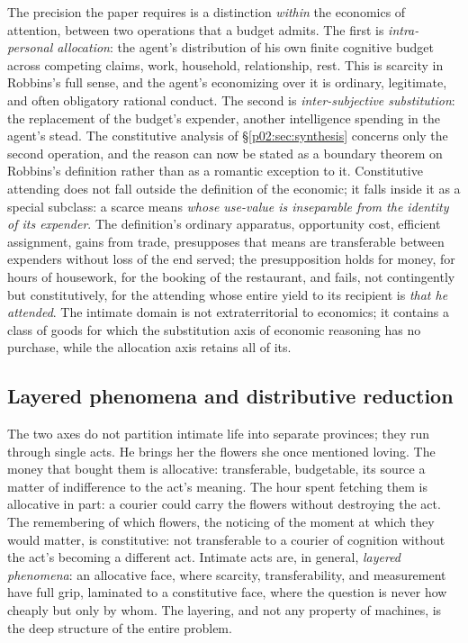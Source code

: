 \documentclass[11pt,a4paper]{article}
\newcommand{\term}[1]{\textit{\textcolor{pinkitalic}{#1}}}
\begin{document}
The precision the paper requires is a distinction \emph{within} the economics of attention, between two operations that a budget admits. The first is \term{intra-personal allocation}: the agent's distribution of his own finite cognitive budget across competing claims, work, household, relationship, rest. This is scarcity in Robbins's full sense, and the agent's economizing over it is ordinary, legitimate, and often obligatory rational conduct. The second is \term{inter-subjective substitution}: the replacement of the budget's expender, another intelligence spending in the agent's stead. The constitutive analysis of \S\ref{p02:sec:synthesis} concerns only the second operation, and the reason can now be stated as a boundary theorem on Robbins's definition rather than as a romantic exception to it. Constitutive attending does not fall outside the definition of the economic; it falls inside it as a special subclass: a scarce means \emph{whose use-value is inseparable from the identity of its expender}. The definition's ordinary apparatus, opportunity cost, efficient assignment, gains from trade, presupposes that means are transferable between expenders without loss of the end served; the presupposition holds for money, for hours of housework, for the booking of the restaurant, and fails, not contingently but constitutively, for the attending whose entire yield to its recipient is \emph{that he attended}. The intimate domain is not extraterritorial to economics; it contains a class of goods for which the substitution axis of economic reasoning has no purchase, while the allocation axis retains all of its.

\subsection{Layered phenomena and distributive reduction}
\label{p02:sec:pe-layered}

The two axes do not partition intimate life into separate provinces; they run through single acts. He brings her the flowers she once mentioned loving. The money that bought them is allocative: transferable, budgetable, its source a matter of indifference to the act's meaning. The hour spent fetching them is allocative in part: a courier could carry the flowers without destroying the act. The remembering of which flowers, the noticing of the moment at which they would matter, is constitutive: not transferable to a courier of cognition without the act's becoming a different act. Intimate acts are, in general, \term{layered phenomena}: an allocative face, where scarcity, transferability, and measurement have full grip, laminated to a constitutive face, where the question is never how cheaply but only by whom. The layering, and not any property of machines, is the deep structure of the entire problem.
\end{document}
